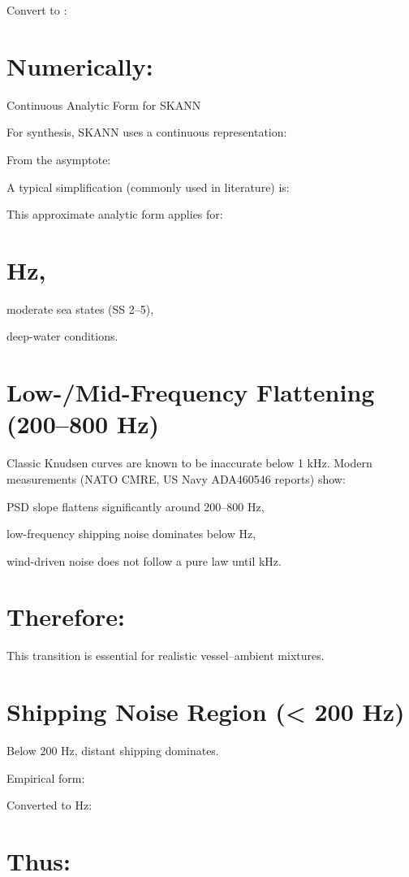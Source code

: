 \documentclass[12pt]{article}
\begin{document}
Convert to :


\section*{Numerically:}


Continuous Analytic Form for SKANN

For synthesis, SKANN uses a continuous representation:


From the asymptote:


A typical simplification (commonly used in literature) is:


This approximate analytic form applies for:

\section*{Hz,}
moderate sea states (SS 2–5),

deep-water conditions.

\section*{Low-/Mid-Frequency Flattening (200–800 Hz)}
Classic Knudsen curves are known to be inaccurate below 1 kHz. Modern measurements (NATO CMRE, US Navy ADA460546 reports) show:

PSD slope flattens significantly around 200–800 Hz,

low-frequency shipping noise dominates below  Hz,

wind-driven noise does not follow a pure  law until  kHz.

\section*{Therefore:}

This transition is essential for realistic vessel–ambient mixtures.

\section*{Shipping Noise Region (< 200 Hz)}
Below 200 Hz, distant shipping dominates.

Empirical form:


Converted to Hz:


\section*{Thus:}
\end{document}
